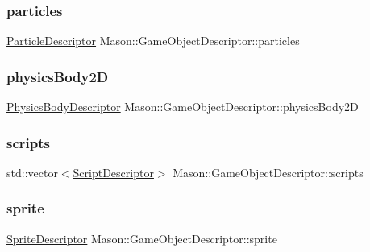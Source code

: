 \subsubsection{\texorpdfstring{particles}{particles}}
{\footnotesize\ttfamily \hyperlink{class_mason_1_1_particle_descriptor}{Particle\+Descriptor} Mason\+::\+Game\+Object\+Descriptor\+::particles}

\hypertarget{class_mason_1_1_game_object_descriptor_a923994ccf28b36e3349e6355d3d0d6bd}{}\label{class_mason_1_1_game_object_descriptor_a923994ccf28b36e3349e6355d3d0d6bd} 
\subsubsection{\texorpdfstring{physics\+Body2D}{physicsBody2D}}
{\footnotesize\ttfamily \hyperlink{class_mason_1_1_physics_body_descriptor}{Physics\+Body\+Descriptor} Mason\+::\+Game\+Object\+Descriptor\+::physics\+Body2D}

\hypertarget{class_mason_1_1_game_object_descriptor_a07c8b975f3306740060a73924c6315a7}{}\label{class_mason_1_1_game_object_descriptor_a07c8b975f3306740060a73924c6315a7} 
\subsubsection{\texorpdfstring{scripts}{scripts}}
{\footnotesize\ttfamily std\+::vector$<$\hyperlink{class_mason_1_1_script_descriptor}{Script\+Descriptor}$>$ Mason\+::\+Game\+Object\+Descriptor\+::scripts}

\hypertarget{class_mason_1_1_game_object_descriptor_aa7e89568fa330d9337093a73b63f2d3e}{}\label{class_mason_1_1_game_object_descriptor_aa7e89568fa330d9337093a73b63f2d3e} 
\subsubsection{\texorpdfstring{sprite}{sprite}}
{\footnotesize\ttfamily \hyperlink{class_mason_1_1_sprite_descriptor}{Sprite\+Descriptor} Mason\+::\+Game\+Object\+Descriptor\+::sprite}

